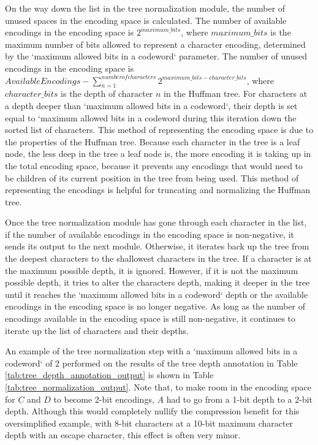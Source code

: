 \documentclass[doublespace,nopageskip]{VTthesis}
\begin{document}
On the way down the list in the tree normalization module, the number of unused spaces in the encoding space is calculated. The number of available encodings in the encoding space is $2^{maximum\_bits}$, where $maximum\_bits$ is the maximum number of bits allowed to represent a character encoding, determined by the `maximum allowed bits in a codeword` parameter. The number of unused encodings in the encoding space is $Available Encodings - \sum_{n=1}^{number of characters}2^{maximum\_bits-character\_bits}$, where $character\_bits$ is the depth of character $n$ in the Huffman tree. For characters at a depth deeper than `maximum allowed bits in a codeword`, their depth is set equal to `maximum allowed bits in a codeword during this iteration down the sorted list of characters. This method of representing the encoding space is due to the properties of the Huffman tree. Because each character in the tree is a leaf node, the less deep in the tree a leaf node is, the more encoding it is taking up in the total encoding space, because it prevents any encodings that would need to be children of its current position in the tree from being used. This method of representing the encodings is helpful for truncating and normalizing the Huffman tree.

Once the tree normalization module has gone through each character in the list, if the number of available encodings in the encoding space is non-negative, it sends its output to the next module. Otherwise, it iterates back up the tree from the deepest characters to the shallowest characters in the tree. If a character is at the maximum possible depth, it is ignored. However, if it is not the maximum possible depth, it tries to alter the characters depth, making it deeper in the tree until it reaches the `maximum allowed bits in a codeword` depth or the available encodings in the encoding space is no longer negative. As long as the number of encodings available in the encoding space is still non-negative, it continues to iterate up the list of characters and their depths.

An example of the tree normalization step with a `maximum allowed bits in a codeword` of 2 performed on the results of the tree depth annotation in Table \ref{tab:tree_depth_annotation_output} is shown in Table \ref{tab:tree_normalization_output}. Note that, to make room in the encoding space for $C$ and $D$ to become 2-bit encodings, $A$ had to go from a 1-bit depth to a 2-bit depth. Although this would completely nullify the compression benefit for this oversimplified example, with 8-bit characters at a 10-bit maximum character depth with an escape character, this effect is often very minor.
\end{document}
